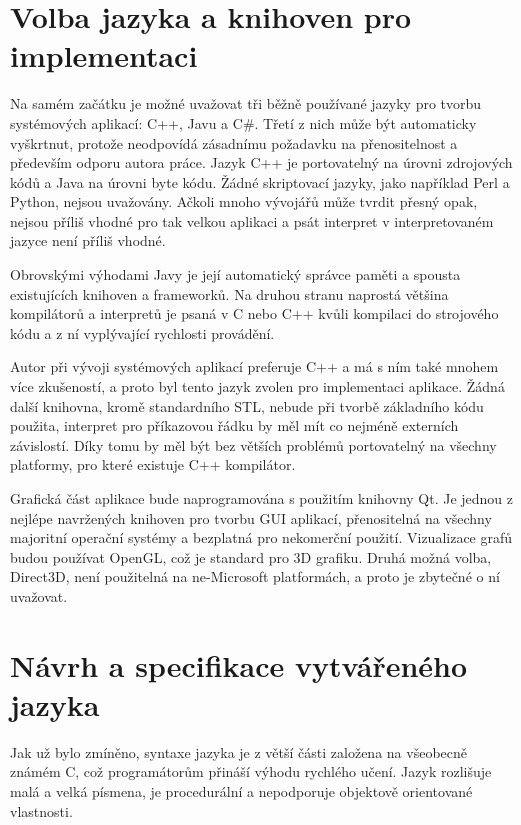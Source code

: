 \documentclass[11pt,twoside,a4paper]{book}
\begin{document}
\section{Volba jazyka a knihoven pro implementaci}

Na samém začátku je možné uvažovat tři běžně používané jazyky pro tvorbu sys\-té\-mo\-vých aplikací: C++, Javu a C\#. Třetí z nich může být automaticky vyškrtnut, protože neodpovídá zásadnímu požadavku na přenositelnost a především odporu autora práce. Jazyk C++ je portovatelný na úrovni zdrojových kódů a Java na úrovni byte kódu. Žádné skriptovací jazyky, jako například Perl a Python, nejsou uvažovány. Ačkoli mnoho vývojářů může tvrdit přesný opak, nejsou příliš vhodné pro tak velkou aplikaci a psát interpret v interpretovaném jazyce není příliš vhodné.

Obrovskými výhodami Javy je její automatický správce paměti a spousta existujících knihoven a frameworků. Na druhou stranu naprostá většina kompilátorů a interpretů je psaná v C nebo C++ kvůli kompilaci do strojového kódu a z ní vyplývající rychlosti provádění.

Autor při vývoji systémových aplikací preferuje C++ a má s ním také mnohem více zku\-še\-no\-stí, a proto byl tento jazyk zvolen pro implementaci aplikace. Žádná další knihovna, kromě standardního STL, nebude při tvorbě základního kódu použita, interpret pro příkazovou řádku by měl mít co nejméně externích závislostí. Díky tomu by měl být bez větších problémů portovatelný na všechny platformy, pro které existuje C++ kompilátor.

Grafická část aplikace bude naprogramována s použitím knihovny Qt. Je jednou z nejlépe navržených knihoven pro tvorbu GUI aplikací, přenositelná na všechny majoritní operační systémy a bezplatná pro nekomerční použití. Vizualizace grafů budou používat OpenGL, což je standard pro 3D grafiku. Druhá možná volba, Direct3D, není použitelná na ne-Microsoft platformách, a proto je zbytečné o ní uvažovat.


\section{Návrh a specifikace vytvářeného jazyka}

Jak už bylo zmíněno, syntaxe jazyka je z větší části založena na všeobecně známém C, což programátorům přináší výhodu rychlého učení. Jazyk rozlišuje malá a velká písmena, je procedurální a nepodporuje objektově orientované vlastnosti.
\end{document}
